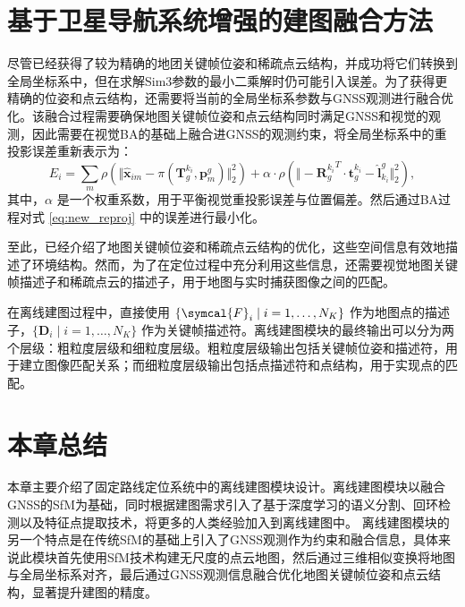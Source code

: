 \section{基于卫星导航系统增强的建图融合方法}
\label{sec:map_fusion}

尽管已经获得了较为精确的地团关键帧位姿和稀疏点云结构，并成功将它们转换到全局坐标系中，但在求解Sim3参数的最小二乘解时仍可能引入误差。为了获得更精确的位姿和点云结构，还需要将当前的全局坐标系参数与GNSS观测进行融合优化。该融合过程需要确保地图关键帧位姿和点云结构同时满足GNSS和视觉的观测，因此需要在视觉BA的基础上融合进GNSS的观测约束，将全局坐标系中的重投影误差重新表示为：
\begin{equation}
\label{eq:new_reproj}
    E_i = \sum_{m}\rho\left(\Vert \hat{\symbf{x}}_{im} - \pi(\symbf{T}^{k_i}_g, \symbf{p}_{m}^{g}) \Vert ^2_2\right) 
    + \alpha \cdot \rho\left(\Vert -{\symbf{R}_g^{k_i}}^T\cdot\symbf{t}_g^{k_i} - \hat{\symbf{l}}_{k_i}^g \Vert_2^2\right),
\end{equation}
其中，$\alpha$ 是一个权重系数，用于平衡视觉重投影误差与位置偏差。然后通过BA过程对式 \eqref{eq:new_reproj} 中的误差进行最小化。

至此，已经介绍了地图关键帧位姿和稀疏点云结构的优化，这些空间信息有效地描述了环境结构。然而，为了在定位过程中充分利用这些信息，还需要视觉地图关键帧描述子和稀疏点云的描述子，用于地图与实时捕获图像之间的匹配。

在离线建图过程中，直接使用 $\{\symcal{F}_i \mid i = 1, \ldots, N_K\}$ 作为地图点的描述子，$\{\symbf{D}_i \mid i = 1, \ldots, N_K\}$ 作为关键帧描述符。离线建图模块的最终输出可以分为两个层级：粗粒度层级和细粒度层级。粗粒度层级输出包括关键帧位姿和描述符，用于建立图像匹配关系；而细粒度层级输出包括点描述符和点结构，用于实现点的匹配。

\section{本章总结}
本章主要介绍了固定路线定位系统中的离线建图模块设计。离线建图模块以融合GNSS的SfM为基础，同时根据建图需求引入了基于深度学习的语义分割、回环检测以及特征点提取技术，将更多的人类经验加入到离线建图中。
离线建图模块的另一个特点是在传统SfM的基础上引入了GNSS观测作为约束和融合信息，具体来说此模块首先使用SfM技术构建无尺度的点云地图，然后通过三维相似变换将地图与全局坐标系对齐，最后通过GNSS观测信息融合优化地图关键帧位姿和点云结构，显著提升建图的精度。
